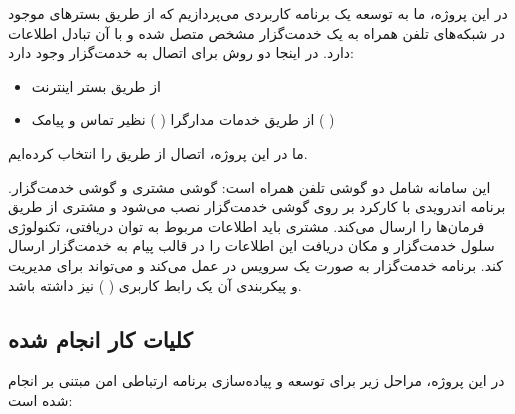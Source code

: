 \documentclass{report}
\begin{document}
در این پروژه، ما به توسعه یک برنامه کاربردی می‌پردازیم که از طریق بسترهای موجود در شبکه‌های تلفن همراه به یک خدمت‌گزار مشخص متصل شده و با آن تبادل اطلاعات دارد. در اینجا دو روش برای اتصال به خدمت‌گزار وجود دارد:
\begin{itemize}
	\item از طریق بستر اینترنت
	\item از طریق خدمات مدارگرا (
	) نظیر تماس و پیامک (
	)
	
\end{itemize}
ما در این پروژه، اتصال از طریق
  را انتخاب کرده‌ایم.

این سامانه شامل دو گوشی تلفن همراه است: گوشی مشتری و گوشی خدمت‌گزار. برنامه اندرویدی با کارکرد
  بر روی گوشی خدمت‌گزار نصب می‌شود و مشتری از طریق
    فرمان‌ها را ارسال می‌کند. مشتری باید اطلاعات مربوط به توان دریافتی، تکنولوژی سلول خدمت‌گزار و مکان دریافت این اطلاعات را در قالب پیام به خدمت‌گزار ارسال کند. برنامه خدمت‌گزار به صورت یک سرویس در
      عمل می‌کند و می‌تواند برای مدیریت و پیکربندی آن یک رابط کاربری (
      ) نیز داشته باشد.

\subsection{کلیات کار انجام شده}
در این پروژه، مراحل زیر برای توسعه و پیاده‌سازی برنامه ارتباطی امن مبتنی بر 
 انجام شده است:
\end{document}
